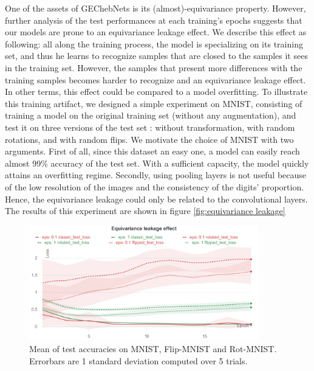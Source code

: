 \documentclass{article}
\newcommand{\haguettaz}[1]{{\color[rgb]{.8,.3,.2}{#1}}}
\begin{document}
One of the assets of GEChebNets is its (almost)-equivariance property. However, further analysis of the test performances at each training's epochs suggests that our models are prone to an equivariance leakage effect. We describe this effect as following: all along the training process, the model is specializing on its training set, and thus he learns to recognize samples that are closed to the samples it sees in the training set. However, the samples that present more differences with the training samples becomes harder to recognize and an equivariance leakage effect. In other terms, this effect could be compared to a model overfitting. To illustrate this training artifact, we designed a simple experiment on MNIST, consisting of training a model on the original training set (without any augmentation), and test it on three versions of the test set : without transformation, with random rotations, and with random flips. We motivate the choice of MNIST with two arguments. First of all, since this dataset an easy one, a model can easily reach almost 99\% accuracy of the test set. With a sufficient capacity, the model quickly attains an overfitting regime. Secondly, using pooling layers is not useful because of the low resolution of the images and the consistency of the digits' proportion. Hence, the equivariance leakage could only be related to the convolutional layers. The results of this experiment are shown in figure \ref{fig:equivariance leakage}


\begin{figure}[h!] 
    \centering
    \includegraphics[width=10cm]{Images/equivariance_leakage.png}
    \caption{Mean of test accuracies on MNIST, Flip-MNIST and Rot-MNIST. Errorbars are 1 standard deviation computed over 5 trials.}
    \label{fig:equivariance_leakage}
\end{figure}

\haguettaz{Comment results of random sub graph algorithms
\begin{itemize}
\item choice of the sampling factor is a tradeoff: too high and the equivariance leakage effect still exists, too low and the model cannot learn as the network is too noisy to allow a correct message passing.
\item Reduce the std by a factor 10, the model is more robust against
\item Both methods work well as the equivariance leakage effect disappeared. We get unprecedented performance on flipped and rotated mnist
\item but the use of random perturbation has a price : longer training and lower performance on the original test set
\end{itemize}}
\end{document}
